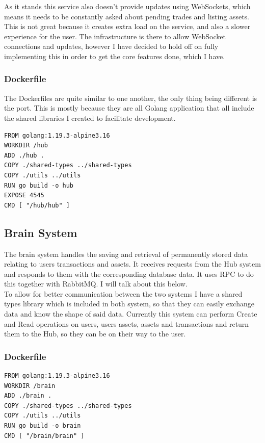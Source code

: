 \documentclass[titlepage]{article}
\begin{document}
As it stands this service also doesn't provide updates using WebSockets, which means it needs to be constantly asked about pending trades and listing assets. This is not great because it creates extra load on the service, and also a slower experience for the user. The infrastructure is there to allow WebSocket connections and updates, however I have decided to hold off on fully implementing this in order to get the core features done, which I have.

\subsubsection{Dockerfile}
The Dockerfiles are quite similar to one another, the only thing being different is the port. This is mostly because they are all Golang application that all include the shared libraries I created to facilitate development.
\begin{verbatim}
FROM golang:1.19.3-alpine3.16
WORKDIR /hub
ADD ./hub .
COPY ./shared-types ../shared-types
COPY ./utils ../utils
RUN go build -o hub
EXPOSE 4545
CMD [ "/hub/hub" ]
\end{verbatim}

\subsection{Brain System}
The brain system handles the saving and retrieval of permanently stored data relating to users transactions and assets. It receives requests from the Hub system and responds to them with the corresponding database data. It uses RPC to do this together with RabbitMQ. I will talk about this below. \\

To allow for better communication between the two systems I have a shared types library which is included in both system, so that they can easily exchange data and know the shape of said data. Currently this system can perform Create and Read operations on users, users assets, assets and transactions and return them to the Hub, so they can be on their way to the user.

\subsubsection{Dockerfile}
\begin{verbatim}
FROM golang:1.19.3-alpine3.16
WORKDIR /brain
ADD ./brain .
COPY ./shared-types ../shared-types
COPY ./utils ../utils
RUN go build -o brain
CMD [ "/brain/brain" ]
\end{verbatim}
\end{document}
